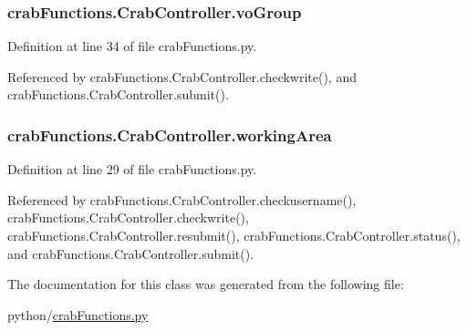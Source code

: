 \subsubsection[{vo\-Group}]{\setlength{\rightskip}{0pt plus 5cm}crab\-Functions.\-Crab\-Controller.\-vo\-Group}\label{classcrabFunctions_1_1CrabController_a5aabe7cb586e56f190dc76228622d961}


Definition at line 34 of file crab\-Functions.\-py.



Referenced by crab\-Functions.\-Crab\-Controller.\-checkwrite(), and crab\-Functions.\-Crab\-Controller.\-submit().

\subsubsection[{working\-Area}]{\setlength{\rightskip}{0pt plus 5cm}crab\-Functions.\-Crab\-Controller.\-working\-Area}\label{classcrabFunctions_1_1CrabController_a95c64682d53afcd3c0d6f3794f12c86a}


Definition at line 29 of file crab\-Functions.\-py.



Referenced by crab\-Functions.\-Crab\-Controller.\-checkusername(), crab\-Functions.\-Crab\-Controller.\-checkwrite(), crab\-Functions.\-Crab\-Controller.\-resubmit(), crab\-Functions.\-Crab\-Controller.\-status(), and crab\-Functions.\-Crab\-Controller.\-submit().



The documentation for this class was generated from the following file\-:\begin{DoxyCompactItemize}
\item 
python/\hyperlink{crabFunctions_8py}{crab\-Functions.\-py}\end{DoxyCompactItemize}
